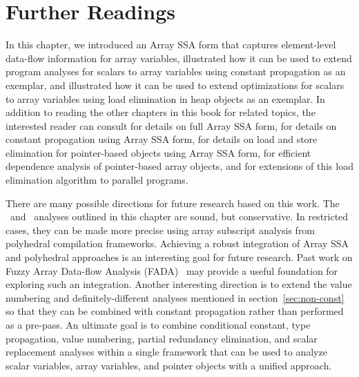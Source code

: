 \section{Further Readings}
\label{sec:conclusions}

In this chapter,
we introduced an Array SSA form 
that captures element-level data-flow information for array variables,
illustrated how it can be used to extend program analyses for
scalars to array variables using constant propagation 
as an exemplar, and illustrated how it can be used to extend
optimizations for scalars to array variables using load elimination in
heap objects as
an exemplar.
In addition to reading the other chapters in this book for related
topics, the interested reader can consult \cite{KnSa98} for 
details on full Array SSA form, \cite{KnSa98b} for details on constant
propagation using Array SSA form, \cite{FiKS00} for
details on load and store elimination for pointer-based objects using
Array SSA form, \cite{SaFi01} for efficient dependence analysis of
pointer-based array objects, and \cite{BaSa09} for extensions of this load
elimination algorithm to parallel programs.


There are many possible directions for future research based on this
work.
The \ds\ and \dd\ analyses outlined in this chapter are sound, but
conservative.  In restricted cases, they can be made more precise using array subscript
analysis from polyhedral compilation frameworks.  Achieving a robust
integration of Array SSA and polyhedral approaches is an interesting goal for future
research.  Past work on Fuzzy Array Data-flow Analysis
(FADA)~\cite{BCF97} may provide a useful foundation for exploring such
an integration.
Another interesting direction is to extend the value numbering and 
definitely-different analyses mentioned in section~\ref{sec:non-const}
so that they can be combined with constant propagation
rather than performed as a pre-pass.
An ultimate goal is
to combine conditional constant, type propagation, value numbering, partial redundancy elimination,
and scalar replacement analyses within a single framework that can be
used to analyze scalar variables, array variables, and pointer objects
with a unified approach.


